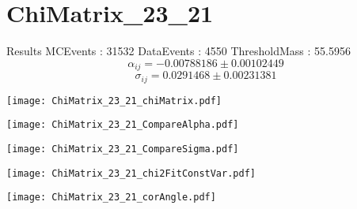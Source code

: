 \documentclass[a4paper,12pt]{article}
\begin{document}
\section{ChiMatrix\_23\_21}
\begin{minipage}{0.49\linewidth} Results \newline
MCEvents : 31532\newline
DataEvents : 4550 \newline
ThresholdMass : 55.5956\\
$$\alpha_{ij} = -0.00788186\pm 0.00102449$$
$$\sigma_{ij} = 0.0291468\pm 0.00231381$$
\end{minipage}\hfill
\begin{minipage}{0.49\linewidth} 
\texttt{[image: ChiMatrix\_23\_21\_chiMatrix.pdf]}\\
\end{minipage}
\hfill
\begin{minipage}{0.49\linewidth} 
\texttt{[image: ChiMatrix\_23\_21\_CompareAlpha.pdf]}\\
\end{minipage}
\hfill
\begin{minipage}{0.49\linewidth} 
\texttt{[image: ChiMatrix\_23\_21\_CompareSigma.pdf]}\\
\end{minipage}
\begin{minipage}{0.49\linewidth} 
\texttt{[image: ChiMatrix\_23\_21\_chi2FitConstVar.pdf]}\\
\end{minipage}
\hfill
\begin{minipage}{0.49\linewidth} 
\texttt{[image: ChiMatrix\_23\_21\_corAngle.pdf]}\\
\end{minipage}
\end{document}
